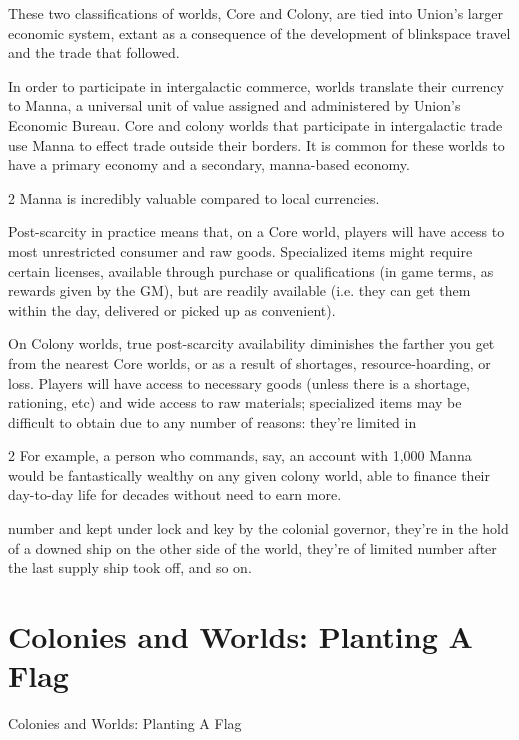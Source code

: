 These two classifications of worlds, Core and Colony, are tied into Union’s larger economic  
system, extant as a consequence of the development of blinkspace travel and the trade that  
followed.  
 

In order to participate in intergalactic commerce, worlds translate their currency to Manna, a  
universal unit of value assigned and administered by Union’s Economic Bureau. Core and colony  
worlds that participate in intergalactic trade use Manna to effect trade outside their borders. It is  
common for these worlds to have a primary economy and a secondary, manna-based economy.  

                                                                       2 
Manna is incredibly valuable compared to local currencies. 
 

Post-scarcity in practice means that, on a Core world, players will have access to most  
unrestricted consumer and raw goods. Specialized items might require certain licenses, available  
through purchase or qualifications (in game terms, as rewards given by the GM), but are readily  
available (i.e. they can get them within the day, delivered or picked up as convenient).
 

On Colony worlds, true post-scarcity availability diminishes the farther you get from the nearest  
Core worlds, or as a result of shortages, resource-hoarding, or loss. Players will have access to  
necessary goods (unless there is a shortage, rationing, etc) and wide access to raw materials;  
specialized items may be difficult to obtain due to any number of reasons: they’re limited in  

2 For example, a person who commands, say, an account with 1,000 Manna would be fantastically wealthy  
on any given colony world, able to finance their day-to-day life for decades without need to earn more.  

                                                                                                                  


number and kept under lock and key by the colonial governor, they’re in the hold of a downed  
ship on the other side of the world, they’re of limited number after the last supply ship took off,  
and so on.      
 
\section{Colonies and Worlds: Planting A Flag}
Colonies and Worlds: Planting A Flag   

